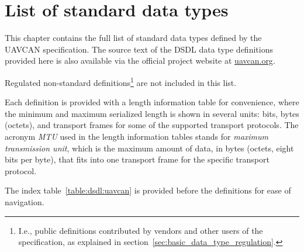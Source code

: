 \chapter{List of standard data types}\label{sec:sdt}

This chapter contains the full list of standard data types defined by the UAVCAN specification.
The source text of the DSDL data type definitions provided here is also available via the
official project website at \href{http://uavcan.org}{uavcan.org}.

Regulated non-standard definitions\footnote{I.e., public definitions contributed by vendors and other users
of the specification, as explained in section~\ref{sec:basic_data_type_regulation}.}
are not included in this list.

Each definition is provided with a length information table for convenience,
where the minimum and maximum serialized length is shown in several units:
bits, bytes (octets), and transport frames for some of the supported transport protocols.
The acronym \emph{MTU} used in the length information tables stands for
\emph{maximum transmission unit}, which is the maximum amount of data, in bytes (octets, eight bits per byte),
that fits into one transport frame for the specific transport protocol.

The index table~\ref{table:dsdl:uavcan} is provided before the definitions for ease of navigation.

\clearpage{}

